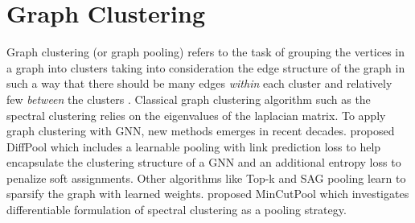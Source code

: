 \section{Graph Clustering}

Graph clustering (or graph pooling) refers to the task of grouping the vertices in a graph into clusters taking into consideration the edge structure of the graph in such a way that there should be many edges \emph{within} each cluster and relatively few \emph{between} the clusters \citep{schaeffer2007graph}. Classical graph clustering algorithm such as the spectral clustering \citep{Luxburg07atutorial} relies on the eigenvalues of the laplacian matrix. To apply graph clustering with GNN, new methods emerges in recent decades. \citet{ying2018hierarchical} proposed DiffPool which includes a learnable pooling with link prediction loss to help encapsulate the clustering structure of a GNN and an additional entropy loss to penalize soft assignments. Other algorithms like Top-k \citep{pmlr-v97-gao19a} and SAG pooling \citep{pmlr-v97-lee19c} learn to sparsify the graph with learned weights. \citet{bianchi2020spectral} proposed MinCutPool which investigates differentiable formulation of spectral clustering as a pooling strategy.












